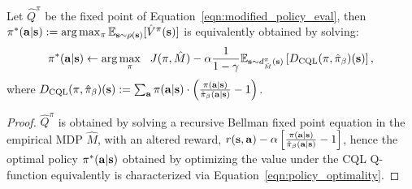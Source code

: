 \begin{lemma}
Let $\hat{Q}^\pi$ be the fixed point of Equation~\ref{eqn:modified_policy_eval}, then $\pi^*(\mathbf{a}|\mathbf{s}) := \arg\max_{\pi} \mathbb{E}_{\mathbf{s} \sim \rho(\mathbf{s})}[\hat{V}^\pi(\mathbf{s})]$ is equivalently obtained by solving:
\begin{equation}
\label{eqn:policy_optimality}
    \pi^*(\mathbf{a}|\mathbf{s}) \leftarrow \arg \max_{\pi}~~ J(\pi, \hat{M}) - \alpha \frac{1}{1 - \gamma} \mathbb{E}_{\mathbf{s} \sim d^\pi_{\hat{M}}(\mathbf{s})}\left[D_{\text{CQL}}(\pi, \hat{\pi}_\beta)(\mathbf{s}) \right],
\end{equation}
where $D_{\text{CQL}}(\pi, \hat{\pi}_\beta)(\mathbf{s}) := \sum_{\mathbf{a}} \pi(\mathbf{a}|\mathbf{s}) \cdot \left(\frac{\pi(\mathbf{a}|\mathbf{s})}{\hat{\pi}_\beta(\mathbf{a}|\mathbf{s})} - 1 \right)$.
\end{lemma}
\begin{proof}
$\hat{Q}^\pi$ is obtained by solving a recursive Bellman fixed point equation in the empirical MDP $\hat{M}$, with an altered reward, $r(\mathbf{s}, \mathbf{a}) - \alpha \left[ \frac{\pi(\mathbf{a}|\mathbf{s})}{\hat{\pi}_\beta(\mathbf{a}|\mathbf{s})} - 1 \right]$, hence the optimal policy $\pi^*(\mathbf{a}|\mathbf{s})$ obtained by optimizing the value under the CQL Q-function equivalently is characterized via Equation~\ref{eqn:policy_optimality}.
\end{proof}

